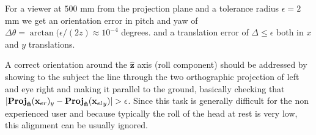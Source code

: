\documentclass[acmtocl,acmnow]{acmtrans2m}
\newcommand{\proj}{\textrm{\textbf{Proj}} }
\begin{document}
For a viewer at $500$ mm from the projection plane and a tolerance radius $\epsilon = 2$ mm we get an orientation error in pitch and yaw of $\Delta \theta = \arctan ( \epsilon/(2z) \approx 10^{-4} $ degrees.
and a translation error of $\Delta \leq \epsilon$ both in $x$ and $y$ translations.

A correct orientation around the $\hat{\mathbf{z}}$ axis (roll component) should be addressed by showing to the subject the line through the two orthographic projection of left and eye right and
 making it parallel to the ground, basically checking that $|\proj_{\mathbf{\hat{n}}}({\mathbf{x}_{er} })_y - \proj_{\mathbf{\hat{n}}}({\mathbf{x}_{el} }_y)|> \epsilon$. Since this task is generally difficult for the non experienced user and because typically the roll of the head at rest is very low, this alignment can be usually ignored.
\end{document}
